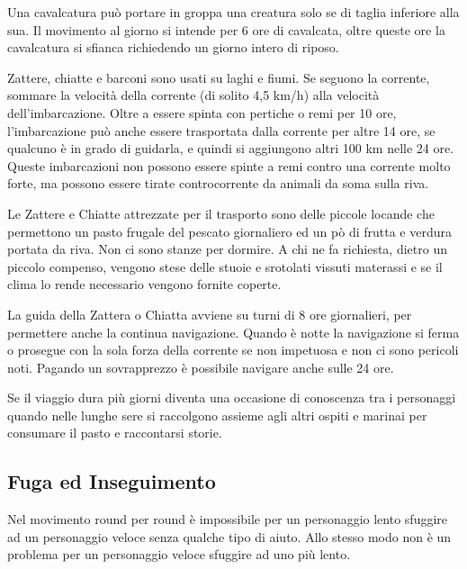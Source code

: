 \begin{multicols}{2}

\bigskip

Una cavalcatura può portare in groppa una creatura solo se di taglia inferiore alla sua. Il movimento al giorno si intende per 6 ore di cavalcata, oltre queste ore la cavalcatura si sfianca richiedendo un giorno intero di riposo.

Zattere, chiatte e barconi sono usati su laghi e fiumi. Se seguono la corrente, sommare la velocità della corrente (di solito 4,5 km/h) alla velocità dell'imbarcazione. Oltre a essere spinta con pertiche o remi per 10 ore, l'imbarcazione può anche essere trasportata dalla corrente per altre 14 ore, se qualcuno è in grado di guidarla, e quindi si aggiungono altri 100 km nelle 24 ore. Queste imbarcazioni non possono essere spinte a remi contro una corrente molto forte, ma possono essere tirate controcorrente da animali da soma sulla riva.

Le Zattere e Chiatte attrezzate per il trasporto sono delle piccole locande che permettono un pasto frugale del pescato giornaliero ed un pò di frutta e verdura portata da riva. Non ci sono stanze per dormire. A chi ne fa richiesta, dietro un piccolo compenso, vengono stese delle stuoie e srotolati vissuti materassi e se il clima lo rende necessario vengono fornite coperte.

La guida della Zattera o Chiatta avviene su turni di 8 ore giornalieri, per permettere anche la continua navigazione. Quando è notte la navigazione si ferma o prosegue con la sola forza della corrente se non impetuosa e non ci sono pericoli noti. Pagando un sovrapprezzo è possibile navigare anche sulle 24 ore.

Se il viaggio dura più giorni diventa una occasione di conoscenza tra i personaggi quando nelle lunghe sere si raccolgono assieme agli altri ospiti e marinai per consumare il pasto e raccontarsi storie.

\subsection{Fuga ed Inseguimento}\label{fugainseguimento}

Nel movimento round per round è impossibile per un personaggio lento sfuggire ad un personaggio veloce senza qualche tipo di aiuto. Allo stesso modo non è un problema per un personaggio veloce sfuggire ad uno più lento.


\end{multicols}
